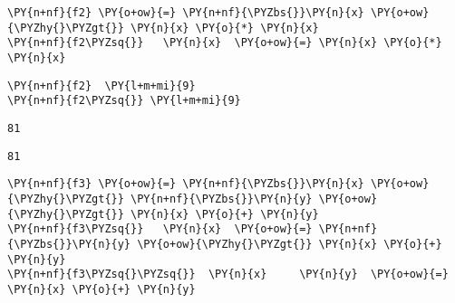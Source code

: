     
    \begin{tcolorbox}[breakable, size=fbox, boxrule=1pt, pad at break*=1mm,colback=cellbackground, colframe=cellborder, top=.75ex]
\begin{Verbatim}[commandchars=\\\{\}]
\PY{n+nf}{f2} \PY{o+ow}{=} \PY{n+nf}{\PYZbs{}}\PY{n}{x} \PY{o+ow}{\PYZhy{}\PYZgt{}} \PY{n}{x} \PY{o}{*} \PY{n}{x}
\PY{n+nf}{f2\PYZsq{}}   \PY{n}{x}  \PY{o+ow}{=} \PY{n}{x} \PY{o}{*} \PY{n}{x}
\end{Verbatim}
\end{tcolorbox}

    \begin{tcolorbox}[breakable, size=fbox, boxrule=1pt, pad at break*=1mm,colback=cellbackground, colframe=cellborder, top=.75ex]
\begin{Verbatim}[commandchars=\\\{\}]
\PY{n+nf}{f2}  \PY{l+m+mi}{9}
\PY{n+nf}{f2\PYZsq{}} \PY{l+m+mi}{9}
\end{Verbatim}
\end{tcolorbox}

    
    \begin{Verbatim}[commandchars=\\\{\}]
81
    \end{Verbatim}

    
    
    \begin{Verbatim}[commandchars=\\\{\}]
81
    \end{Verbatim}

    
    \begin{tcolorbox}[breakable, size=fbox, boxrule=1pt, pad at break*=1mm,colback=cellbackground, colframe=cellborder, top=.75ex]
\begin{Verbatim}[commandchars=\\\{\}]
\PY{n+nf}{f3} \PY{o+ow}{=} \PY{n+nf}{\PYZbs{}}\PY{n}{x} \PY{o+ow}{\PYZhy{}\PYZgt{}} \PY{n+nf}{\PYZbs{}}\PY{n}{y} \PY{o+ow}{\PYZhy{}\PYZgt{}} \PY{n}{x} \PY{o}{+} \PY{n}{y}
\PY{n+nf}{f3\PYZsq{}}   \PY{n}{x}  \PY{o+ow}{=} \PY{n+nf}{\PYZbs{}}\PY{n}{y} \PY{o+ow}{\PYZhy{}\PYZgt{}} \PY{n}{x} \PY{o}{+} \PY{n}{y}
\PY{n+nf}{f3\PYZsq{}\PYZsq{}}  \PY{n}{x}     \PY{n}{y}  \PY{o+ow}{=} \PY{n}{x} \PY{o}{+} \PY{n}{y}
\end{Verbatim}
\end{tcolorbox}

